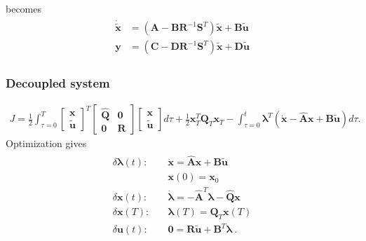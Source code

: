 \documentclass[letterpaper,10pt,english]{jupyterBook}
\begin{document}
\sphinxAtStartPar
becomes
\begin{equation*}
\begin{split}\begin{aligned}
  \dot{\widetilde{\mathbf{x}}} & = \left( \mathbf{A} - \mathbf{B} \mathbf{R}^{-1} \mathbf{S}^T \right) \widetilde{\mathbf{x}} + \mathbf{B} \widetilde{\mathbf{u}} \\
       \mathbf{y}  & = \left( \mathbf{C} - \mathbf{D} \mathbf{R}^{-1} \mathbf{S}^T \right) \widetilde{\mathbf{x}} + \mathbf{D} \widetilde{\mathbf{u}} 
\end{aligned}\end{split}
\end{equation*}\subsubsection*{Decoupled system}
\begin{equation*}
\begin{split}J = \frac{1}{2} \int_{\tau=0}^{T} \begin{bmatrix} \mathbf{x} \\ \widetilde{\mathbf{u}} \end{bmatrix}^T \begin{bmatrix} \hat{\mathbf{Q}} & \mathbf{0} \\ \mathbf{0} & \mathbf{R} \end{bmatrix} \begin{bmatrix} \mathbf{x} \\ \widetilde{\mathbf{u}} \end{bmatrix} d \tau + \frac{1}{2} \mathbf{x}_T^T \mathbf{Q}_T \mathbf{x}_T - \int_{\tau=0}^{t} \boldsymbol\lambda^T \left( \dot{\mathbf{x}} - \hat{\mathbf{A}} \mathbf{x} + \mathbf{B} \widetilde{\mathbf{u}} \right) d \tau .\end{split}
\end{equation*}
\sphinxAtStartPar
Optimization gives
\begin{equation}\label{equation:ch/control/optimal-control-full-state-linear:eq:optimal:ode:linear:decoupling}
\begin{split}\begin{aligned}
 \delta \boldsymbol\lambda(t): & \quad \dot{\mathbf{x}} = \hat{\mathbf{A}} \mathbf{x} + \mathbf{B} \widetilde{\mathbf{u}} \\
                               & \quad \mathbf{x}(0) = \mathbf{x}_0 \\
 \delta \mathbf{x}(t)        : & \quad \dot{\boldsymbol{\lambda}} = - \hat{\mathbf{A}}^T \boldsymbol\lambda - \hat{\mathbf{Q}} \mathbf{x} \\
 \delta \mathbf{x}(T)        : & \quad \boldsymbol\lambda(T) = \mathbf{Q}_T \mathbf{x}(T) \\
 \delta \mathbf{u}(t)        : & \quad \mathbf{0} = \mathbf{R} \widetilde{\mathbf{u}} + \mathbf{B}^T \boldsymbol\lambda \ .
\end{aligned}\end{split}
\end{equation}
\end{document}
